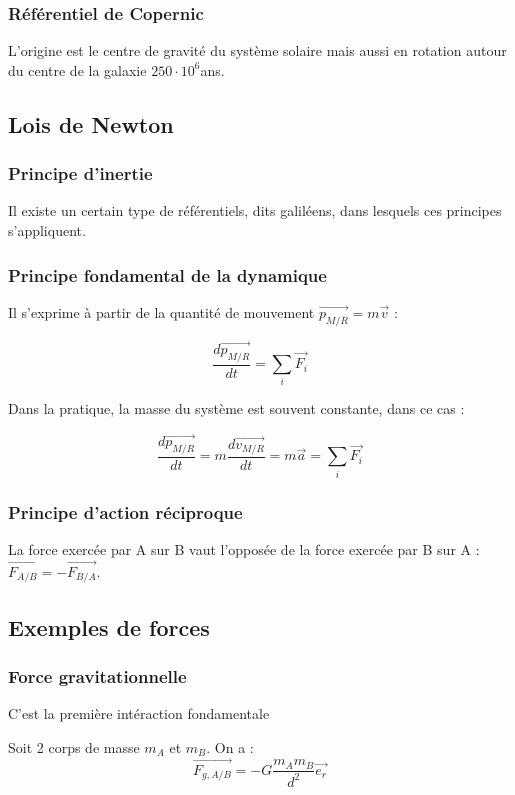 \documentclass[french]{yLectureNote}
\renewcommand{\vec}{\overrightarrow}
\begin{document}
\subsubsection{Référentiel de Copernic}
L'origine est le centre de gravité du système solaire mais aussi en rotation autour du centre de la galaxie $250\cdot10^6$ans.
\subsection{Lois de Newton}
\subsubsection{Principe d'inertie}
Il existe un certain type de référentiels, dits galiléens, dans lesquels ces principes s'appliquent.
\subsubsection{Principe fondamental de la dynamique}
Il s'exprime à partir de la quantité de mouvement $\vec{p_{M/R}} = m\vec{v}$ :

\begin{theorem}[Relation]
\[\frac{d\vec{p_{M/R}}}{dt} = \sum_i \vec{F_i}\]
\end{theorem}

Dans la pratique, la masse du système est souvent constante, dans ce cas :

\begin{theorem}[Relation]
\[\frac{d\vec{p_{M/R}}}{dt} = m\frac{d\vec{v_{M/R}}}{dt} =  m\vec{a} = \sum_i \vec{F_i}\]
\end{theorem}
\subsubsection{Principe d'action réciproque}
La force exercée par A sur B vaut l'opposée de la force exercée par B sur A : $\vec{F_{A/B}} = - \vec{F_{B/A}}$.
\subsection{Exemples de forces}
\subsubsection{Force gravitationnelle}
C'est la première intéraction fondamentale

Soit 2 corps de masse $m_A$ et $m_B$. On a :
\[\vec{F_{g,A/B}} = -G\frac{m_Am_B}{d^2} \vec{e_r}\]
\end{document}
